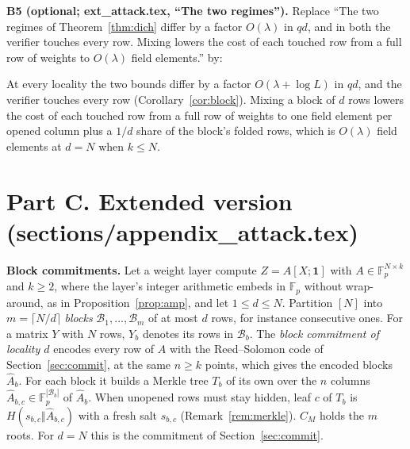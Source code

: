 \documentclass[conference,compsoc]{IEEEtran}
\newcommand{\para}[1]{\par\noindent\textbf{#1}\quad}
\newcommand{\F}{\mathbb{F}_p}
\theoremstyle{plain}
\theoremstyle{definition}
\theoremstyle{remark}
\begin{document}
\para{B5 (optional; ext\_attack.tex, ``The two regimes'').} Replace ``The two regimes of
Theorem~\ref{thm:dich} differ by a factor $O(\lambda)$ in $qd$, and in both the verifier touches every
row. Mixing lowers the cost of each touched row from a full row of weights to $O(\lambda)$ field
elements.'' by:

\smallskip
\noindent At every locality the two bounds differ by a factor $O(\lambda+\log L)$ in $qd$, and the
verifier touches every row (Corollary~\ref{cor:block}). Mixing a block of $d$ rows lowers the cost of
each touched row from a full row of weights to one field element per opened column plus a $1/d$ share
of the block's folded rows, which is $O(\lambda)$ field elements at $d=N$ when $k\le N$.
\smallskip

\section*{Part C. Extended version (sections/appendix\_attack.tex)}

\para{Block commitments.} Let a weight layer compute $Z=A[X;\mathbf 1]$ with $A\in\F^{N\times k}$ and
$k\ge2$, where the layer's integer arithmetic embeds in $\F$ without wrap-around, as in
Proposition~\ref{prop:amp}, and let $1\le d\le N$. Partition $[N]$ into $m=\lceil N/d\rceil$
\emph{blocks} $\mathcal B_1,\dots,\mathcal B_m$ of at most $d$ rows, for instance consecutive ones.
For a matrix $Y$ with $N$ rows, $Y_b$ denotes its rows in $\mathcal B_b$. The \emph{block commitment
of locality $d$} encodes every row of $A$ with the Reed--Solomon code of Section~\ref{sec:commit}, at
the same $n\ge k$ points, which gives the encoded blocks $\hat A_b$. For each block it builds a Merkle
tree $T_b$ of its own over the $n$ columns $\hat A_{b,c}\in\F^{|\mathcal B_b|}$ of $\hat A_b$. When
unopened rows must stay hidden, leaf $c$ of $T_b$ is $H(s_{b,c}\Vert\hat A_{b,c})$ with a fresh salt
$s_{b,c}$ (Remark~\ref{rem:merkle}). $C_M$ holds the $m$ roots. For $d=N$ this is the commitment of
Section~\ref{sec:commit}.
\end{document}
